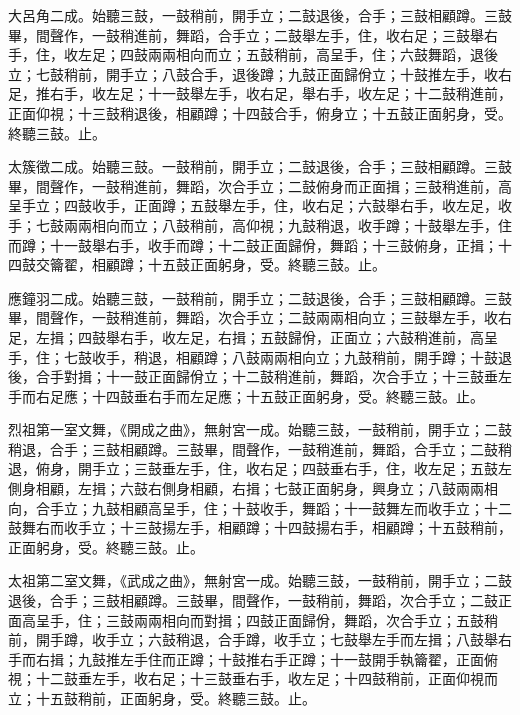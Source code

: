\begin{pinyinscope}
 大呂角二成。始聽三鼓，一鼓稍前，開手立；二鼓退後，合手；三鼓相顧蹲。三鼓畢，間聲作，一鼓稍進前，舞蹈，合手立；二鼓舉左手，住，收右足；三鼓舉右手，住，收左足；四鼓兩兩相向而立；五鼓稍前，高呈手，住；六鼓舞蹈，退後立；七鼓稍前，開手立；八鼓合手，退後蹲；九鼓正面歸佾立；十鼓推左手，收右足，推右手，收左足；十一鼓舉左手，收右足，舉右手，收左足；十二鼓稍進前，正面仰視；十三鼓稍退後，相顧蹲；十四鼓合手，俯身立；十五鼓正面躬身，受。終聽三鼓。止。



 太簇徵二成。始聽三鼓。一鼓稍前，開手立；二鼓退後，合手；三鼓相顧蹲。三鼓畢，間聲作，一鼓稍進前，舞蹈，次合手立；二鼓俯身而正面揖；三鼓稍進前，高呈手立；四鼓收手，正面蹲；五鼓舉左手，住，收右足；六鼓舉右手，收左足，收手；七鼓兩兩相向而立；八鼓稍前，高仰視；九鼓稍退，收手蹲；十鼓舉左手，住而蹲；十一鼓舉右手，收手而蹲；十二鼓正面歸佾，舞蹈；十三鼓俯身，正揖；十四鼓交籥翟，相顧蹲；十五鼓正面躬身，受。終聽三鼓。止。



 應鐘羽二成。始聽三鼓，一鼓稍前，開手立；二鼓退後，合手；三鼓相顧蹲。三鼓畢，間聲作，一鼓稍進前，舞蹈，次合手立；二鼓兩兩相向立；三鼓舉左手，收右足，左揖；四鼓舉右手，收左足，右揖；五鼓歸佾，正面立；六鼓稍進前，高呈手，住；七鼓收手，稍退，相顧蹲；八鼓兩兩相向立；九鼓稍前，開手蹲；十鼓退後，合手對揖；十一鼓正面歸佾立；十二鼓稍進前，舞蹈，次合手立；十三鼓垂左手而右足應；十四鼓垂右手而左足應；十五鼓正面躬身，受。終聽三鼓。止。



 烈祖第一室文舞，《開成之曲》，無射宮一成。始聽三鼓，一鼓稍前，開手立；二鼓稍退，合手；三鼓相顧蹲。三鼓畢，間聲作，一鼓稍進前，舞蹈，合手立；二鼓稍退，俯身，開手立；三鼓垂左手，住，收右足；四鼓垂右手，住，收左足；五鼓左側身相顧，左揖；六鼓右側身相顧，右揖；七鼓正面躬身，興身立；八鼓兩兩相向，合手立；九鼓相顧高呈手，住；十鼓收手，舞蹈；十一鼓舞左而收手立；十二鼓舞右而收手立；十三鼓揚左手，相顧蹲；十四鼓揚右手，相顧蹲；十五鼓稍前，正面躬身，受。終聽三鼓。止。



 太祖第二室文舞，《武成之曲》，無射宮一成。始聽三鼓，一鼓稍前，開手立；二鼓退後，合手；三鼓相顧蹲。三鼓畢，間聲作，一鼓稍前，舞蹈，次合手立；二鼓正面高呈手，住；三鼓兩兩相向而對揖；四鼓正面歸佾，舞蹈，次合手立；五鼓稍前，開手蹲，收手立；六鼓稍退，合手蹲，收手立；七鼓舉左手而左揖；八鼓舉右手而右揖；九鼓推左手住而正蹲；十鼓推右手正蹲；十一鼓開手執籥翟，正面俯視；十二鼓垂左手，收右足；十三鼓垂右手，收左足；十四鼓稍前，正面仰視而立；十五鼓稍前，正面躬身，受。終聽三鼓。止。




\end{pinyinscope}
